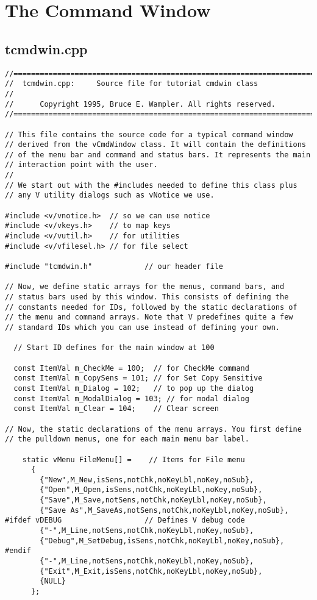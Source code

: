 \section{The Command Window}

\subsection*{tcmdwin.cpp}

%
\footnotesize
\begin{verbatim}
//========================================================================
//  tcmdwin.cpp:     Source file for tutorial cmdwin class
//
//      Copyright 1995, Bruce E. Wampler. All rights reserved.
//========================================================================

// This file contains the source code for a typical command window
// derived from the vCmdWindow class. It will contain the definitions
// of the menu bar and command and status bars. It represents the main
// interaction point with the user.
// 
// We start out with the #includes needed to define this class plus
// any V utility dialogs such as vNotice we use.

#include <v/vnotice.h>  // so we can use notice
#include <v/vkeys.h>    // to map keys
#include <v/vutil.h>    // for utilities
#include <v/vfilesel.h> // for file select

#include "tcmdwin.h"            // our header file

// Now, we define static arrays for the menus, command bars, and
// status bars used by this window. This consists of defining the
// constants needed for IDs, followed by the static declarations of
// the menu and command arrays. Note that V predefines quite a few
// standard IDs which you can use instead of defining your own.

  // Start ID defines for the main window at 100

  const ItemVal m_CheckMe = 100;  // for CheckMe command
  const ItemVal m_CopySens = 101; // for Set Copy Sensitive
  const ItemVal m_Dialog = 102;   // to pop up the dialog
  const ItemVal m_ModalDialog = 103; // for modal dialog
  const ItemVal m_Clear = 104;    // Clear screen

// Now, the static declarations of the menu arrays. You first define
// the pulldown menus, one for each main menu bar label.

    static vMenu FileMenu[] =    // Items for File menu
      {
        {"New",M_New,isSens,notChk,noKeyLbl,noKey,noSub},
        {"Open",M_Open,isSens,notChk,noKeyLbl,noKey,noSub},
        {"Save",M_Save,notSens,notChk,noKeyLbl,noKey,noSub},
        {"Save As",M_SaveAs,notSens,notChk,noKeyLbl,noKey,noSub},
#ifdef vDEBUG                   // Defines V debug code
        {"-",M_Line,notSens,notChk,noKeyLbl,noKey,noSub},
        {"Debug",M_SetDebug,isSens,notChk,noKeyLbl,noKey,noSub},
#endif
        {"-",M_Line,notSens,notChk,noKeyLbl,noKey,noSub},
        {"Exit",M_Exit,isSens,notChk,noKeyLbl,noKey,noSub},
        {NULL}
      };


\end{verbatim}
